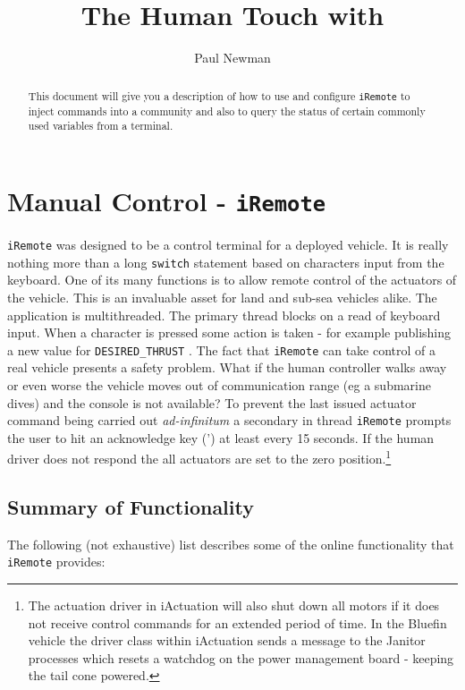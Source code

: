 \documentclass[a4paper,10pt]{article}
\title{The Human Touch with \code{iRemote}}
\author{Paul Newman}
\newcommand{\Code}[1]{\texttt{#1} }
\newcommand{\code}[1]{\Code{#1} }
\begin{document}
\maketitle

\begin{center}
\end{center}
\begin{abstract}
This document will give you a description of how to use and configure \code{iRemote} to inject commands into a community and 
also to query the status of certain commonly used variables from a terminal.
\end{abstract}

\section{Manual Control - \code{iRemote}}\label{sec:iRemote}
%
\code{iRemote} was designed to be a control terminal for a
deployed vehicle. It is really nothing more than a long
\code{switch} statement based on characters input from the
keyboard. One of its many functions is to allow remote control of
the actuators of the vehicle. This is an invaluable asset for land
and sub-sea vehicles alike. The application is multithreaded. The
primary thread blocks on a read of keyboard input. When a
character is pressed some action is taken - for example publishing
a new value for \code{DESIRED\_THRUST}. The fact that \code{iRemote}
can take control of a real vehicle presents a safety problem. What
if the human controller walks away or even worse the vehicle moves
out of communication range (eg a submarine dives) and the console
is not available? To prevent the last issued actuator command
being carried out {\it{ad-infinitum }} a secondary in thread
\code{iRemote} prompts the user to hit an acknowledge key (') at
least every 15 seconds. If the human driver does not respond the
all actuators are set to the zero position.\footnote{The actuation
driver  in iActuation will also shut down all motors if it does
not receive control commands for an extended period of time. In
the Bluefin vehicle the driver class within iActuation sends a
message to the Janitor processes which resets a watchdog on the
power management board - keeping the tail cone powered.}

\subsection{Summary of Functionality}
The following (not exhaustive) list describes some of the online
functionality that \code{iRemote} provides:
\end{document}
